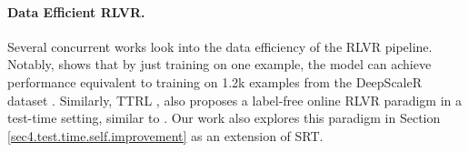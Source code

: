 \paragraph{Data Efficient RLVR.} Several concurrent works look into the data efficiency of the RLVR pipeline. Notably, \citep{wang2025reinforcementlearningreasoninglarge} shows that by just training on one example, the model can achieve performance equivalent to training on 1.2k examples from the DeepScaleR dataset \citep{deepscaler2025}. Similarly, TTRL \citep{zuo2025ttrl}, also proposes a label-free online RLVR paradigm in a test-time setting, similar to \algo{}. Our work also explores this paradigm in Section \ref{sec4.test.time.self.improvement} as an extension of SRT.
